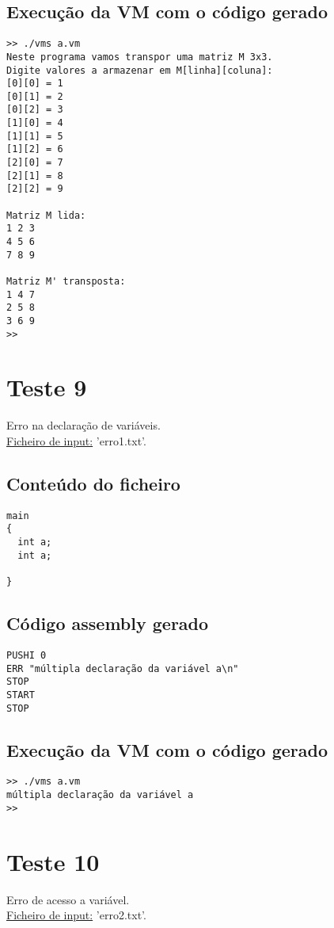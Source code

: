 \documentclass[11pt,a4paper]{report}%
\begin{document}
\subsection{Execução da VM com o código gerado}

\begin{verbatim}
>> ./vms a.vm
Neste programa vamos transpor uma matriz M 3x3.
Digite valores a armazenar em M[linha][coluna]:
[0][0] = 1
[0][1] = 2
[0][2] = 3
[1][0] = 4
[1][1] = 5
[1][2] = 6
[2][0] = 7
[2][1] = 8
[2][2] = 9

Matriz M lida:
1 2 3 
4 5 6 
7 8 9 

Matriz M' transposta:
1 4 7 
2 5 8 
3 6 9 
>>
\end{verbatim}



\section{Teste 9}
Erro na declaração de variáveis. \\
\underline{Ficheiro de input:} 'erro1.txt'.

\subsection{Conteúdo do ficheiro}

\begin{verbatim}
main
{
  int a;
  int a;

}
\end{verbatim}


\subsection{Código assembly gerado}
\begin{verbatim}
PUSHI 0
ERR "múltipla declaração da variável a\n"
STOP
START
STOP
\end{verbatim}


\subsection{Execução da VM com o código gerado}

\begin{verbatim}
>> ./vms a.vm
múltipla declaração da variável a
>>
\end{verbatim}

\section{Teste 10}
Erro de acesso a variável. \\
\underline{Ficheiro de input:} 'erro2.txt'.
\end{document}
